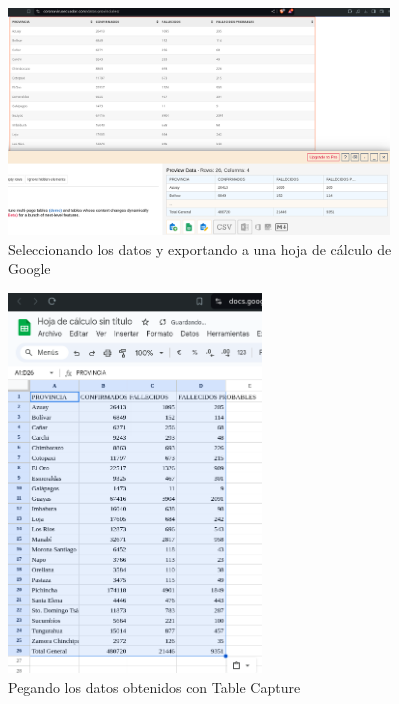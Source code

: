 \documentclass[12pt]{article}
\begin{document}
                        \begin{figure}[!h]
                                \centering
                                \includegraphics[width=0.9\textwidth]{img/tablecapture-2.png}
                                \caption{Seleccionando los datos y exportando a una hoja de cálculo de Google}
                        \end{figure}

                        \newpage
                        \begin{figure}[!h]
                                \centering
                                \includegraphics[width=0.6\textwidth]{img/tablecapture-3.png}
                                \caption{Pegando los datos obtenidos con Table Capture}
                        \end{figure}
\end{document}
